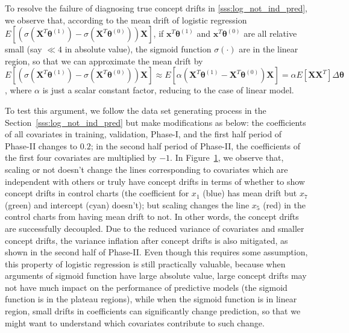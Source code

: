 \documentclass[twoside,11pt]{article}
\begin{document}
\begin{enumerate}[(I)]
\begin{figure}[!htbp]
{%
}
  \label{fig:log_reg_not_ind_X_1}
\end{figure}

To resolve the failure of diagnosing true concept drifts in \ref{sss:log_not_ind_pred}, we observe that, according to the mean drift of logistic regression $E [ (\sigma (\bm {X}^T\bm { \theta}^{ (1)}) - \sigma ( \bm {X}^T\bm { \theta}^{ (0)})) \bm {X}] $, if $ \bm {x}^T\bm { \theta}^{ (1)}$ and $ \bm {x}^T\bm { \theta}^{ (0)}$ are all relative small (say $\ll 4$ in absolute value), the sigmoid function $ \sigma (\cdot)$ are in the linear region, so that we can approximate the mean drift by $E [ (\sigma ( \bm {X}^T\bm { \theta}^{ (1)} ) - \sigma ( \bm {X}^T\bm { \theta}^{ (0)} )) \bm {X}] \approx E [ \alpha( \bm {X}^T\bm { \theta}^{ (1)} -  \bm {X}^T\bm { \theta}^{ (0)} ) \bm {X}] = \alpha E[\bm{XX}^T] \Delta \bm { \theta} $, where $ \alpha$ is just a scalar constant factor, reducing to the case of linear model.  

To test this argument, we follow the data set generating process in the Section~\ref{sss:log_not_ind_pred} but make modifications as below: the coefficients of all covariates in training, validation, Phase-I, and the first half period of Phase-II changes to $0.2$; in the second half period of Phase-II, the coefficients of the first four covariates are multiplied by $-1$. In Figure~\ref{fig:log_reg_not_ind_X_1}, we observe that, scaling or not doesn't change the lines corresponding to covariates which are independent with others or truly have concept drifts in terms of whether to show concept drifts in control charts (the coefficient for $x_1$ (blue) has mean drift but $x_7$ (green) and intercept (cyan) doesn't); but scaling changes the line $x_5$ (red) in the control charts from having mean drift to not. In other words, the concept drifts are successfully decoupled. Due to the reduced variance of covariates and smaller concept drifts, the variance inflation after concept drifts is also mitigated, as shown in the second half of Phase-II. Even though this requires some assumption, this property of logistic regression is still practically valuable, because when arguments of sigmoid function have large absolute value, large concept drifts may not have much impact on the performance of predictive models (the sigmoid function is in the plateau regions), while when the sigmoid function is in linear region, small drifts in coefficients can significantly change prediction, so that we might want to understand which covariates contribute to such change.


\end{enumerate}
\end{document}
